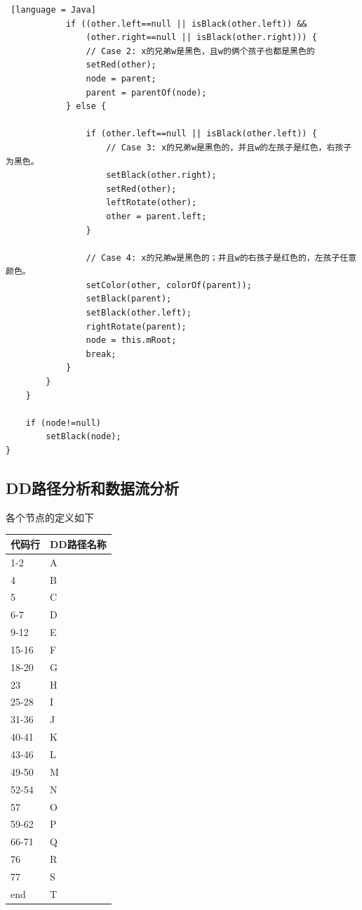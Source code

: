 \documentclass[12pt, a4paper, oneside]{ctexart}
\begin{document}
\begin{lstlisting} [language = Java]
            if ((other.left==null || isBlack(other.left)) &&
                (other.right==null || isBlack(other.right))) {
                // Case 2: x的兄弟w是黑色，且w的俩个孩子也都是黑色的  
                setRed(other);
                node = parent;
                parent = parentOf(node);
            } else {

                if (other.left==null || isBlack(other.left)) {
                    // Case 3: x的兄弟w是黑色的，并且w的左孩子是红色，右孩子为黑色。  
                    setBlack(other.right);
                    setRed(other);
                    leftRotate(other);
                    other = parent.left;
                }

                // Case 4: x的兄弟w是黑色的；并且w的右孩子是红色的，左孩子任意颜色。
                setColor(other, colorOf(parent));
                setBlack(parent);
                setBlack(other.left);
                rightRotate(parent);
                node = this.mRoot;
                break;
            }
        }
    }

    if (node!=null)
        setBlack(node);
}
\end{lstlisting}

\subsection{DD路径分析和数据流分析}

各个节点的定义如下

\newpage
\begin{table}[!h]
    \begin{tabular}{|l|l|}
    \hline
    代码行 & DD路径名称\\ \hline
    1-2 & A\\ \hline
    4 & B\\ \hline
    5 & C \\ \hline
    6-7 & D \\ \hline
    9-12 & E \\ \hline
    15-16 & F \\ \hline
    18-20 & G \\ \hline
    23 & H \\ \hline
    25-28 & I \\ \hline
    31-36 & J \\ \hline
    40-41 & K \\ \hline
    43-46 & L \\ \hline
    49-50 & M \\ \hline
    52-54 & N \\ \hline
    57 & O \\ \hline
    59-62 & P \\ \hline
    66-71 & Q \\ \hline
    76 & R \\ \hline
    77 & S \\ \hline
    end & T \\ \hline
    \end{tabular}
\end{table}
\end{document}
